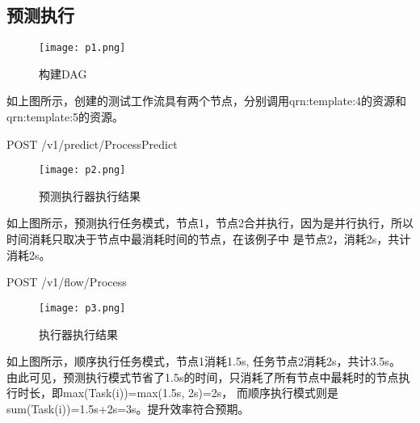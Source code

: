 \subsection{预测执行}


\begin{figure}[H]
    \centering
    \texttt{[image: p1.png]}
    \caption{构建DAG}
    \label{fig:6-3-2}
\end{figure}
如上图所示，创建的测试工作流具有两个节点，分别调用qrn:template:4的资源和qrn:template:5的资源。

POST /v1/predict/ProcessPredict

\begin{figure}[H]
    \centering
    \texttt{[image: p2.png]}
    \caption{预测执行器执行结果}
    \label{fig:6-3-3}
\end{figure}

如上图所示，预测执行任务模式，节点1，节点2合并执行，因为是并行执行，所以时间消耗只取决于节点中最消耗时间的节点，在该例子中
是节点2，消耗2s，共计消耗2s。

POST /v1/flow/Process

\begin{figure}[H]
    \centering
    \texttt{[image: p3.png]}
    \caption{执行器执行结果}
    \label{fig:6-3-3-res}
\end{figure}

如上图所示，顺序执行任务模式，节点1消耗1.5s, 任务节点2消耗2s，共计3.5s。
由此可见，预测执行模式节省了1.5s的时间，只消耗了所有节点中最耗时的节点执行时长，即max(Task(i))=max(1.5s, 2s)=2s，
而顺序执行模式则是sum(Task(i))=1.5s+2s=3s。提升效率符合预期。








